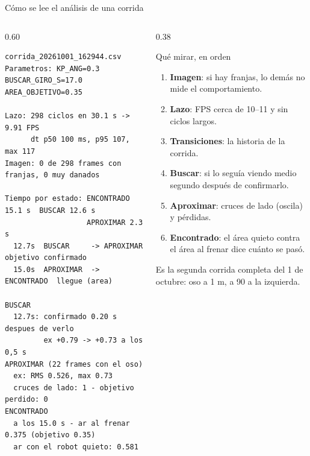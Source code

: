 \begin{frame}[fragile]{Cómo se lee el análisis de una corrida}
\begin{columns}[T,onlytextwidth]
\begin{column}{0.60\textwidth}
\scriptsize
\begin{verbatim}
corrida_20261001_162944.csv
Parametros: KP_ANG=0.3  BUSCAR_GIRO_S=17.0  AREA_OBJETIVO=0.35

Lazo: 298 ciclos en 30.1 s -> 9.91 FPS
      dt p50 100 ms, p95 107, max 117
Imagen: 0 de 298 frames con franjas, 0 muy danados

Tiempo por estado: ENCONTRADO 15.1 s  BUSCAR 12.6 s
                   APROXIMAR 2.3 s
  12.7s  BUSCAR     -> APROXIMAR   objetivo confirmado
  15.0s  APROXIMAR  -> ENCONTRADO  llegue (area)

BUSCAR
  12.7s: confirmado 0.20 s despues de verlo
         ex +0.79 -> +0.73 a los 0,5 s
APROXIMAR (22 frames con el oso)
  ex: RMS 0.526, max 0.73
  cruces de lado: 1 - objetivo perdido: 0
ENCONTRADO
  a los 15.0 s - ar al frenar 0.375 (objetivo 0.35)
  ar con el robot quieto: 0.581
\end{verbatim}
\end{column}
\begin{column}{0.38\textwidth}
\footnotesize
\begin{block}{Qué mirar, en orden}
  \begin{enumerate}
    \item \textbf{Imagen}: si hay franjas, lo demás no mide el
          comportamiento.
    \item \textbf{Lazo}: FPS cerca de 10--11 y sin ciclos largos.
    \item \textbf{Transiciones}: la historia de la corrida.
    \item \textbf{Buscar}: si lo seguía viendo medio segundo después de
          confirmarlo.
    \item \textbf{Aproximar}: cruces de lado (oscila) y pérdidas.
    \item \textbf{Encontrado}: el área quieto contra el área al frenar dice
          cuánto se pasó.
  \end{enumerate}
\end{block}
Es la segunda corrida completa del 1 de octubre: oso a 1 m, a 90\grad{} a la
izquierda.
\end{column}
\end{columns}
\end{frame}

